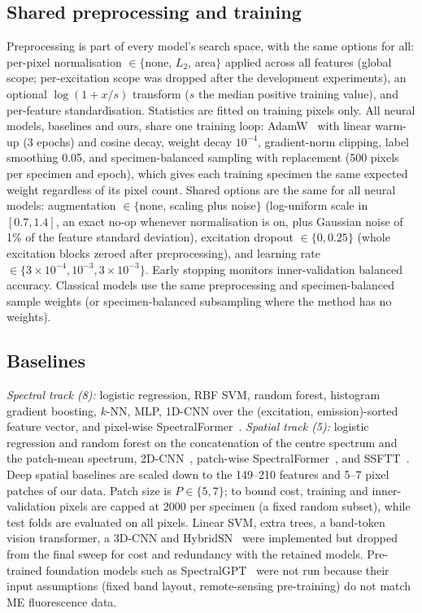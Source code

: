 \documentclass[journal]{IEEEtran}
\begin{document}
\subsection{Shared preprocessing and training}\label{sec:preproc}
Preprocessing is part of every model's search space, with the same options for all: per-pixel normalisation $\in\{$none, $L_2$, area$\}$ applied across all features (global scope; per-excitation scope was dropped after the development experiments), an optional $\log(1+x/s)$ transform ($s$ the median positive training value), and per-feature standardisation. Statistics are fitted on training pixels only. All neural models, baselines and ours, share one training loop: AdamW~\cite{loshchilov2019adamw} with linear warm-up (3 epochs) and cosine decay, weight decay $10^{-4}$, gradient-norm clipping, label smoothing 0.05, and specimen-balanced sampling with replacement (500 pixels per specimen and epoch), which gives each training specimen the same expected weight regardless of its pixel count. Shared options are the same for all neural models: augmentation $\in\{$none, scaling plus noise$\}$ (log-uniform scale in $[0.7,1.4]$, an exact no-op whenever normalisation is on, plus Gaussian noise of 1\% of the feature standard deviation), excitation dropout $\in\{0,0.25\}$ (whole excitation blocks zeroed after preprocessing), and learning rate $\in\{3\!\times\!10^{-4},10^{-3},3\!\times\!10^{-3}\}$. Early stopping monitors inner-validation balanced accuracy. Classical models use the same preprocessing and specimen-balanced sample weights (or specimen-balanced subsampling where the method has no weights).

\subsection{Baselines}
\emph{Spectral track (8):} logistic regression, RBF SVM, random forest, histogram gradient boosting, $k$-NN, MLP, 1D-CNN over the (excitation, emission)-sorted feature vector, and pixel-wise SpectralFormer~\cite{hong2022spectralformer}. \emph{Spatial track (5):} logistic regression and random forest on the concatenation of the centre spectrum and the patch-mean spectrum, 2D-CNN~\cite{chen2016cnnhsi,hamida20183d}, patch-wise SpectralFormer~\cite{hong2022spectralformer}, and SSFTT~\cite{sun2022ssftt}. Deep spatial baselines are scaled down to the 149--210 features and 5--7 pixel patches of our data. Patch size is $P\in\{5,7\}$; to bound cost, training and inner-validation pixels are capped at 2000 per specimen (a fixed random subset), while test folds are evaluated on all pixels. Linear SVM, extra trees, a band-token vision transformer, a 3D-CNN and HybridSN~\cite{roy2020hybridsn} were implemented but dropped from the final sweep for cost and redundancy with the retained models. Pre-trained foundation models such as SpectralGPT~\cite{hong2024spectralgpt} were not run because their input assumptions (fixed band layout, remote-sensing pre-training) do not match ME fluorescence data.
\end{document}
